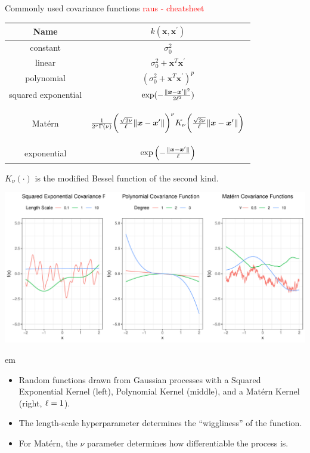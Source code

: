 \documentclass[11pt,compress,t,notes=noshow, xcolor=table]{beamer}
\begin{document}
\begin{vbframe}{Commonly used covariance functions}
\textcolor{red}{raus - cheatsheet}
\begin{table}[]
\centering
\begin{tabular}{|c|c|}
\hline
Name & $k(\bm{x}, \bm{x}^\prime)$\\
\hline
constant & $\sigma_0^2$ \\ [1em]
linear & $\sigma_0^2 + \bm{x}^T\bm{x}^\prime$ \\ [1em]
polynomial & $(\sigma_0^2 + \bm{x}^T\bm{x}^\prime)^p$ \\ [1em]
squared exponential & $\exp(- \frac{\|\bm{x} - \bm{x}^\prime\|^2}{2\ell^2})$ \\ [1em]
Matérn & \begin{footnotesize} $\frac{1}{2^\nu \Gamma(\nu)}\biggl(\frac{\sqrt{2 \nu}}{\ell}\|\bm{x} - \bm{x}^\prime\|\biggr)^{\nu} K_\nu\biggl(\frac{\sqrt{2 \nu}}{\ell}\|\bm{x} - \bm{x}^\prime\|\biggr)$\end{footnotesize}  \\ [1em]
exponential & $\exp\left(- \frac{\|\bm{x} - \bm{x}^\prime\|}{\ell}\right)$ \\ [1em]
\hline
\end{tabular}
\end{table}
\begin{footnotesize}
$K_\nu(\cdot)$ is the modified Bessel function of the second kind.
\end{footnotesize}


\begin{center}

\includegraphics{figure/covariance.pdf}
\end{center}
 em
\begin{footnotesize}
\begin{itemize}
\item Random functions drawn from Gaussian processes with a Squared Exponential Kernel (left), Polynomial Kernel (middle), and a Matérn Kernel (right, $\ell = 1$). 
\item The length-scale hyperparameter determines the ``wiggliness'' of the function.
\item For Matérn, the $\nu$ parameter determines how differentiable the process is.
\end{itemize}
\end{footnotesize}
\end{vbframe}
\end{document}
